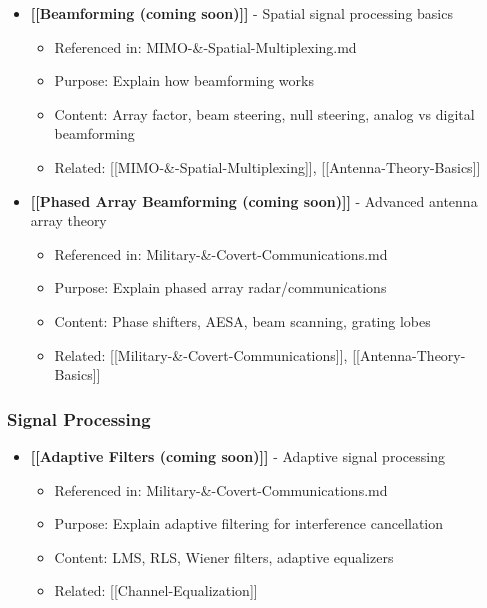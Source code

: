 \begin{itemize}
\tightlist
\item
  \textbf{{[}{[}Beamforming (coming soon){]}{]}} - Spatial signal
  processing basics

  \begin{itemize}
  \tightlist
  \item
    Referenced in: MIMO-\&-Spatial-Multiplexing.md
  \item
    Purpose: Explain how beamforming works
  \item
    Content: Array factor, beam steering, null steering, analog vs
    digital beamforming
  \item
    Related: {[}{[}MIMO-\&-Spatial-Multiplexing{]}{]},
    {[}{[}Antenna-Theory-Basics{]}{]}
  \end{itemize}
\item
  \textbf{{[}{[}Phased Array Beamforming (coming soon){]}{]}} - Advanced
  antenna array theory

  \begin{itemize}
  \tightlist
  \item
    Referenced in: Military-\&-Covert-Communications.md
  \item
    Purpose: Explain phased array radar/communications
  \item
    Content: Phase shifters, AESA, beam scanning, grating lobes
  \item
    Related: {[}{[}Military-\&-Covert-Communications{]}{]},
    {[}{[}Antenna-Theory-Basics{]}{]}
  \end{itemize}
\end{itemize}

\subsubsection{Signal Processing}\label{signal-processing}

\begin{itemize}
\tightlist
\item
  \textbf{{[}{[}Adaptive Filters (coming soon){]}{]}} - Adaptive signal
  processing

  \begin{itemize}
  \tightlist
  \item
    Referenced in: Military-\&-Covert-Communications.md
  \item
    Purpose: Explain adaptive filtering for interference cancellation
  \item
    Content: LMS, RLS, Wiener filters, adaptive equalizers
  \item
    Related: {[}{[}Channel-Equalization{]}{]}
  \end{itemize}
\end{itemize}

